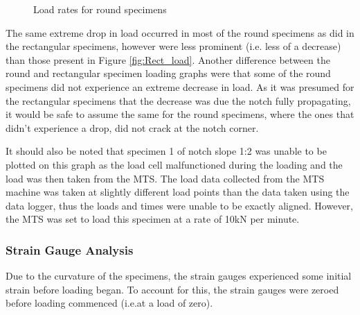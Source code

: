 \documentclass[11pt,a4paper]{article}
\numberwithin{equation}{subsection}
\begin{document}
\begin{figure}[h]
	\begin{center}
	\end{center}
	\caption{Load rates for round specimens}
	\label{fig:Round_load}
\end{figure}

\noindent
The same extreme drop in load occurred in most of the round specimens as did in the rectangular specimens, however were less prominent (i.e. less of a decrease) than those present in Figure \ref{fig:Rect_load}. Another difference between the round and rectangular specimen loading graphs were that some of the round specimens did not experience an extreme decrease in load. As it was presumed for the rectangular specimens that the decrease was due the notch fully propagating, it would be safe to assume the same for the round specimens, where the ones that didn't experience a drop, did not crack at the notch corner. 

\vspace*{\baselineskip}

\noindent
It should also be noted that specimen 1 of notch slope 1:2 was unable to be plotted on this graph as the load cell malfunctioned during the loading and the load was then taken from the MTS. The load data collected from the MTS machine was taken at slightly different load points than the data taken using the data logger, thus the loads and times were unable to be exactly aligned. However, the MTS was set to load this specimen at a rate of 10kN per minute.  


\subsubsection{Strain Gauge Analysis}
Due to the curvature of the specimens, the strain gauges experienced some initial strain before loading began. To account for this, the strain gauges were zeroed before loading commenced (i.e.at a load of zero).
\end{document}
